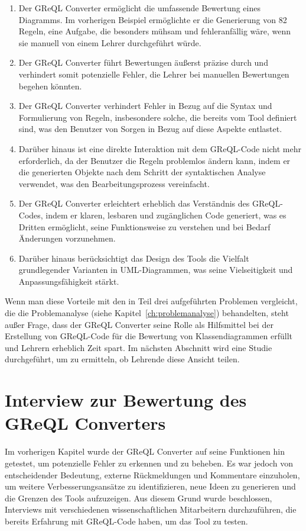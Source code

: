 \begin{enumerate}
    \item Der GReQL Converter ermöglicht die umfassende Bewertung eines Diagramms. Im vorherigen Beispiel ermöglichte er
die Generierung von 82 Regeln, eine Aufgabe, die besonders mühsam und fehleranfällig wäre, wenn sie manuell von einem
Lehrer durchgeführt würde.
    \item Der GReQL Converter führt Bewertungen äußerst präzise durch und verhindert somit potenzielle Fehler, die
Lehrer bei manuellen Bewertungen begehen könnten.
    \item Der GReQL Converter verhindert Fehler in Bezug auf die Syntax und Formulierung von Regeln, insbesondere
solche, die bereits vom Tool definiert sind, was den Benutzer von Sorgen in Bezug auf diese Aspekte entlastet.
    \item Darüber hinaus ist eine direkte Interaktion mit dem GReQL-Code nicht mehr erforderlich, da der Benutzer die
Regeln problemlos ändern kann, indem er die generierten Objekte nach dem Schritt der syntaktischen Analyse verwendet,
was den Bearbeitungsprozess vereinfacht.
    \item Der GReQL Converter erleichtert erheblich das Verständnis des GReQL-Codes, indem er klaren, lesbaren und
zugänglichen Code generiert, was es Dritten ermöglicht, seine Funktionsweise zu verstehen und bei Bedarf Änderungen
vorzunehmen.
    \item Darüber hinaus berücksichtigt das Design des Tools die Vielfalt grundlegender Varianten in UML-Diagrammen,
was seine Vielseitigkeit und Anpassungsfähigkeit stärkt.
\end{enumerate}

Wenn man diese Vorteile mit den in Teil drei aufgeführten Problemen vergleicht, die die
Problemanalyse (siehe Kapitel~\ref{ch:problemanalyse}) behandelten, steht außer Frage, dass der GReQL Converter seine Rolle als
Hilfsmittel bei der Erstellung von GReQL-Code für die Bewertung von Klassendiagrammen erfüllt und Lehrern erheblich
Zeit spart. Im nächsten Abschnitt wird eine Studie durchgeführt, um zu ermitteln, ob Lehrende diese Ansicht teilen.

\section{Interview zur Bewertung des GReQL Converters}

Im vorherigen Kapitel wurde der GReQL Converter auf seine Funktionen hin getestet, um potenzielle Fehler zu erkennen und
zu beheben. Es war jedoch von entscheidender Bedeutung, externe Rückmeldungen und Kommentare einzuholen, um weitere
Verbesserungsansätze zu identifizieren, neue Ideen zu generieren und die Grenzen des Tools aufzuzeigen. Aus diesem Grund
wurde beschlossen, Interviews mit verschiedenen wissenschaftlichen Mitarbeitern durchzuführen, die bereits Erfahrung
mit GReQL-Code haben, um das Tool zu testen.

